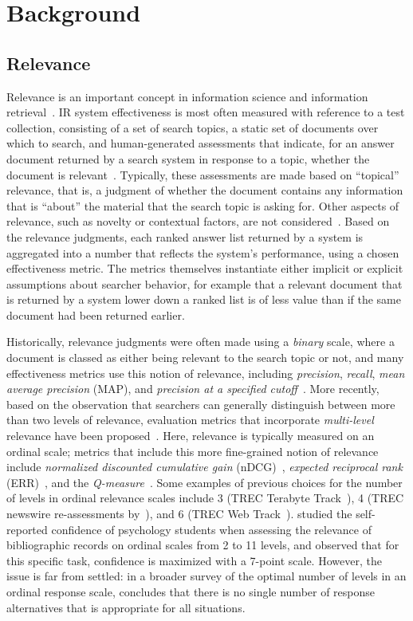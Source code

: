
\section{Background}
\label{sec-background}

\subsection{Relevance} 
Relevance is an important concept in information science and
information retrieval~\cite{Sar07}.
IR system effectiveness is most often measured with reference to a test
collection, consisting of a set of search topics, a static set of
documents over which to search, and human-generated assessments that
indicate, for an answer document returned by a search system in
response to a topic, whether the document is relevant~\citep{VooHar05}.
Typically, these assessments are made based on ``topical'' relevance,
that is, a judgment of whether the document contains any information
that is ``about'' the material that the search topic is asking for.
Other aspects of relevance, such as novelty or contextual factors, are
not considered~\cite{Sar07}.
Based on the relevance judgments, each ranked answer list returned by
a system is aggregated into a number that reflects the system's
performance, using a chosen effectiveness metric.
The metrics themselves instantiate either implicit or explicit assumptions
about searcher behavior, for example that a relevant document that is
returned by a system lower down a ranked list is of less value
than if the same document had been returned earlier.

Historically, relevance judgments were often made using a 
\emph{binary} scale, where a document is classed as either being
relevant to the search topic or not, and many effectiveness metrics use
this notion of relevance, including 
\emph{precision}, \emph{recall}, 
\emph{mean average precision} (MAP), and \emph{precision at a specified cutoff}~\cite{VooHar05}.
More recently, based on the observation that searchers can generally
distinguish between more than two levels of relevance, evaluation
metrics that incorporate \emph{multi-level} relevance have been
proposed~\cite{JarKek02}.
Here, relevance is typically measured on an ordinal scale; metrics that
include this more fine-grained notion of relevance include 
\emph{normalized discounted cumulative gain} (nDCG)~\cite{JarKek02},
\emph{expected reciprocal rank} (ERR)~\cite{ChaMet09}, and the
\emph{Q-measure}~\cite{Sakai07}.
Some examples of previous choices for the number of levels in ordinal
relevance scales include 3 (TREC Terabyte Track~\cite{ClaCra04}), 4
(TREC newswire re-assessments by~\citet{Sormunen:2002}), and 6 (TREC
Web Track~\cite{ColBen14}).
\citet{TanSha99} studied the self-reported confidence of psychology
students when assessing the relevance of bibliographic records on
ordinal scales from 2 to 11 levels, and observed that for this specific
task, confidence is maximized with a 7-point scale.
However, the issue is far from settled: in a broader survey of the optimal number of levels in an ordinal
response scale, \citet{Cox80} concludes that there is no single number
of response alternatives that is appropriate for all situations.

